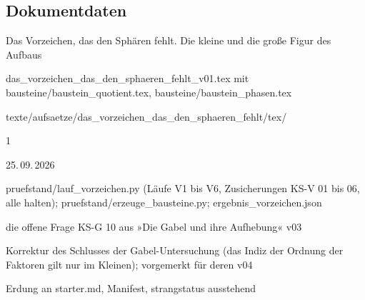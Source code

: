 \documentclass[11pt,a4paper]{article}
\begin{document}
\vfill
\sloppy
\subsection*{Dokumentdaten}
\begin{description}[itemsep=0pt,font=\normalfont\bfseries]
\item[Titel:] Das Vorzeichen, das den Sphären fehlt. Die kleine und die große Figur des Aufbaus
\item[Datei:] das\_vorzeichen\_das\_den\_sphaeren\_fehlt\_v01.tex mit bausteine/baustein\_quotient.tex, bausteine/baustein\_phasen.tex
\item[Ablage:] texte/aufsaetze/das\_vorzeichen\_das\_den\_sphaeren\_fehlt/tex/
\item[Version:] 1
\item[Datum:] 25.\,09.\,2026
\item[Prüfstand:] pruefstand/lauf\_vorzeichen.py (Läufe V1 bis V6, Zusicherungen KS-V 01 bis 06, alle halten); pruefstand/erzeuge\_bausteine.py; ergebnis\_vorzeichen.json
\item[Anlass:] die offene Frage KS-G 10 aus »Die Gabel und ihre Aufhebung« v03
\item[Folge:] Korrektur des Schlusses der Gabel-Untersuchung (das Indiz der Ordnung der Faktoren gilt nur im Kleinen); vorgemerkt für deren v04
\item[Offen:] Erdung an starter.md, Manifest, strangstatus ausstehend
\end{description}
\end{document}
